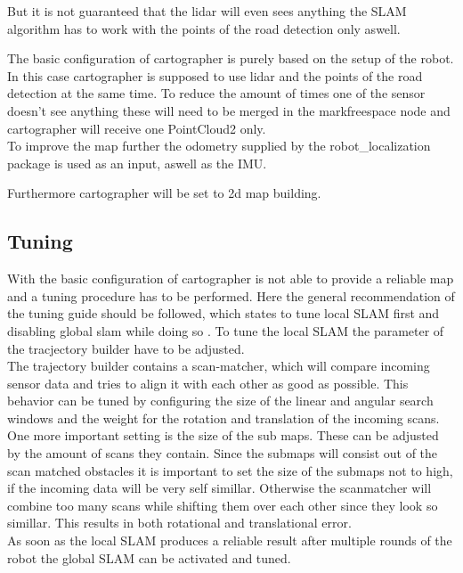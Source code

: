 But it is not guaranteed that the lidar will even sees anything the SLAM algorithm has to work with the points of the road detection only aswell.

The basic configuration of cartographer is purely based on the setup of the robot. In this case cartographer is supposed to use lidar and the points of the road detection at the same time. To reduce the amount of times one of the sensor doesn't see anything these will need to be merged in the markfreespace node and cartographer will receive one PointCloud2 only.\\
To improve the map further the odometry supplied by the robot\_localization package is used as an input, aswell as the IMU.

Furthermore cartographer will be set to 2d map building.


\subsection{Tuning}
With the basic configuration of cartographer is not able to provide a reliable map and a tuning procedure has to be performed. Here the general recommendation of the tuning guide should be followed, which states to tune local SLAM first and disabling global slam while doing so \cite{cartographertuning}.
To tune the local SLAM the parameter of the tracjectory builder have to be adjusted.\\
The trajectory builder contains a scan-matcher, which will compare incoming sensor data and tries to align it with each other as good as possible. This behavior can be tuned by configuring the size of the linear and angular search windows and the weight for the rotation and translation of the incoming scans.\\
One more important setting is the size of the sub maps. These can be adjusted by the amount of scans they contain. Since the submaps will consist out of the scan matched obstacles it is important to set the size of the submaps not to high, if the incoming data will be very self simillar. Otherwise the scanmatcher will combine too many scans while shifting them over each other since they look so simillar. This results in both rotational and translational error.\\
As soon as the local SLAM produces a reliable result after multiple rounds of the robot the global SLAM can be activated and tuned.\\

